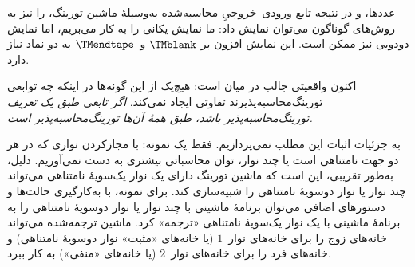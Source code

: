 \documentclass[../../../include/open-logic-section]{subfiles}
\begin{document}
عددها، و در نتیجه تابع ورودی--خروجیِ محاسبه‌شده به‌وسیلهٔ ماشین
تورینگ، را نیز به روش‌های گوناگون می‌توان نمایش داد: ما نمایش یکانی
را به کار می‌بریم، اما نمایش دودویی نیز ممکن است. این نمایش افزون بر
$\TMblank$ و~$\TMendtape$ به دو نماد نیاز دارد.

اکنون واقعیتی جالب در میان است: هیچ‌یک از این گونه‌ها در اینکه چه
توابعی تورینگ‌محاسبه‌پذیرند تفاوتی ایجاد نمی‌کند. \emph{اگر تابعی
طبق یک تعریف تورینگ‌محاسبه‌پذیر باشد، طبق همهٔ آن‌ها
تورینگ‌محاسبه‌پذیر است.}

به جزئیات اثبات این مطلب نمی‌پردازیم. فقط یک نمونه: با مجازکردن نواری
که در هر دو جهت نامتناهی است یا چند نوار، توان محاسباتی بیشتری به دست
نمی‌آوریم. دلیل، به‌طور تقریبی، این است که ماشین تورینگ دارای یک نوار
یک‌سویهٔ نامتناهی می‌تواند چند نوار یا نوار دوسویهٔ نامتناهی را
شبیه‌سازی کند. برای نمونه، با به‌کارگیری حالت‌ها و دستورهای اضافی
می‌توان برنامهٔ ماشینی با چند نوار یا نوار دوسویهٔ نامتناهی را به
برنامهٔ ماشینی با یک نوار یک‌سویهٔ نامتناهی «ترجمه» کرد. ماشین
ترجمه‌شده می‌تواند خانه‌های زوج را برای خانه‌های نوار~$1$ (یا
خانه‌های «مثبت» نوار دوسویهٔ نامتناهی) و خانه‌های فرد را برای
خانه‌های نوار~$2$ (یا خانه‌های «منفی») به کار ببرد.
\end{document}
